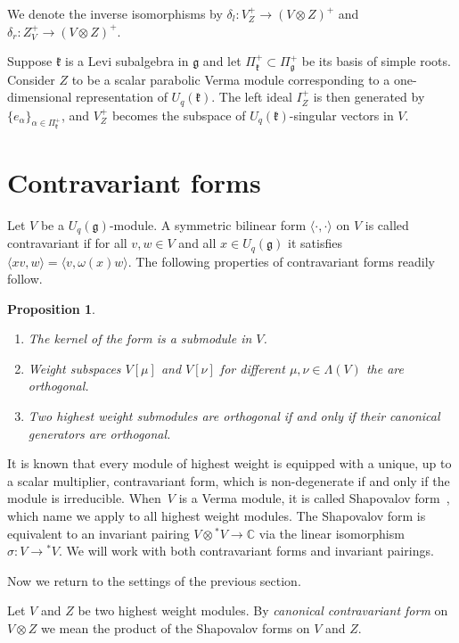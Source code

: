 \documentclass[11pt]{article}
\numberwithin{equation}{section}
\newtheorem{Proposition}[Theorem]{Proposition}
 { \theoremstyle{definition}
\newtheorem{Definition}[Theorem]{Definition}
\newtheorem{Example}[Theorem]{Example}
\newtheorem{Remark}[Theorem]{Remark} }
\begin{document}
We denote the inverse isomorphisms by $\delta_l \colon V^+_Z\to (V\otimes Z)^+$ and $\delta_r\colon Z^+_V\to (V\otimes Z)^+$.

\begin{Example}Suppose $\mathfrak{k}$ is a Levi subalgebra in $\mathfrak{g}$ and let $\Pi^+_\mathfrak{k}\subset \Pi^+_\mathfrak{g}$ be its basis of simple roots. Consider $Z$ to be a scalar parabolic Verma module corresponding to a one-dimensional representation of $U_q(\mathfrak{k})$. The left ideal $I^+_Z$ is then generated by $\{e_\alpha\}_{\alpha\in \Pi^+_\mathfrak{k}}$, and $V^+_Z$ becomes the subspace of $U_q(\mathfrak{k})$-singular vectors in $V$.
\end{Example}

\section{Contravariant forms}
Let $V$ be a $U_q(\mathfrak{g})$-module. A symmetric bilinear form $\langle \cdot,\cdot\rangle$ on $V$ is called contravariant if for all $v,w\in V$ and all $x\in U_q(\mathfrak{g})$ it satisfies $\langle x v, w\rangle=\langle v,\omega(x)w\rangle$. The following properties of contravariant forms readily follow.
\begin{Proposition}\label{form_features} \quad
\begin{enumerate}\itemsep=0pt
 \item[$i)$] The kernel of the form is a submodule in $V$.
 \item[$ii)$] Weight subspaces $V[\mu]$ and $V[\nu]$ for different $\mu,\nu\in \Lambda(V)$ the are orthogonal.
 \item[$iii)$] Two highest weight submodules are orthogonal if and only if their canonical generators are orthogonal.
 \end{enumerate}
\end{Proposition}

 It is known that every module of highest weight is equipped with a unique, up to a scalar multiplier, contravariant form, which is non-degenerate if and only if the module is irreducible. When~$V$ is a Verma module, it is called Shapovalov form~\cite{Sh}, which name we apply to all highest weight modules. The Shapovalov form is equivalent to an invariant pairing $V\otimes {}^*\!V\to \mathbb{C}$ via the linear isomorphism $\sigma \colon V\to {}^*\!V$. We will work with both contravariant forms and invariant pairings.

Now we return to the settings of the previous section.
\begin{Definition} Let $V$ and $Z$ be two highest weight modules. By {\em canonical contravariant form} on $V\otimes Z$ we mean the product of the Shapovalov forms on $V$ and $Z$.
\end{Definition}
\end{document}
